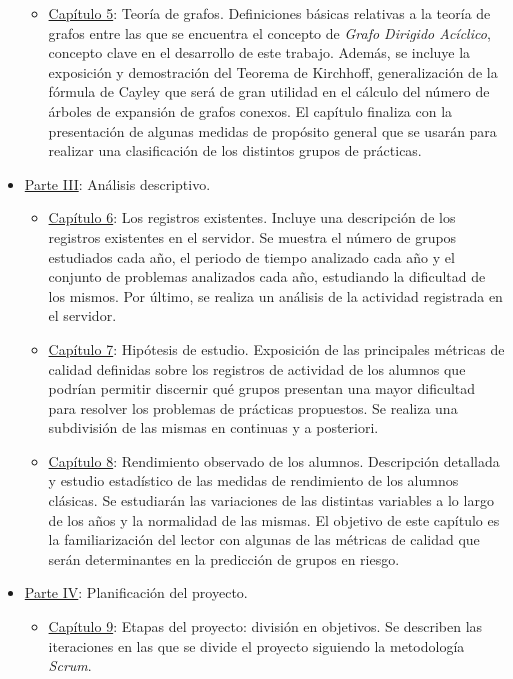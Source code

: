 \begin{itemize}
\begin{itemize}
\item \hyperref[sec:chapterV]{Capítulo 5}: Teoría de grafos. Definiciones básicas relativas a la teoría de grafos entre las que se encuentra el concepto de \emph{Grafo Dirigido Acíclico}, concepto clave en el desarrollo de este trabajo. Además, se incluye la exposición y demostración del Teorema de Kirchhoff, generalización de la fórmula de Cayley que será de gran utilidad en el cálculo del número de árboles de expansión de grafos conexos. El capítulo finaliza con la presentación de algunas medidas de propósito general que se usarán para realizar una clasificación de los distintos grupos de prácticas.
\end{itemize}
\item \hyperref[sec:parteIII]{Parte III}: Análisis descriptivo.
\begin{itemize}
\item \hyperref[sec:chapterVI]{Capítulo 6}: Los registros existentes.  Incluye una descripción de los registros existentes en el servidor. Se muestra el número de grupos estudiados cada año, el periodo de tiempo analizado cada año y el conjunto de problemas analizados cada año, estudiando la dificultad de los mismos. Por último, se realiza un análisis de la actividad registrada en el servidor.
\item \hyperref[sec:chapterVII]{Capítulo 7}: Hipótesis de estudio. Exposición de las principales métricas de calidad definidas sobre los registros de actividad de los alumnos que podrían permitir discernir qué grupos presentan una mayor dificultad para resolver los problemas de prácticas propuestos. Se realiza una subdivisión de las mismas en continuas y a posteriori.
\item \hyperref[chapter:rendimiento]{Capítulo 8}: Rendimiento observado de los alumnos. Descripción detallada y estudio estadístico de las medidas de rendimiento de los alumnos clásicas. Se estudiarán las variaciones de las distintas variables a lo largo de los años y la normalidad de las mismas. El objetivo de este capítulo es la familiarización del lector con algunas de las métricas de calidad que serán determinantes en la predicción de grupos en riesgo.
\end{itemize}
\item \hyperref[sec:parteIV]{Parte IV}: Planificación del proyecto.
\begin{itemize}
\item \hyperref[chapter:objetivos]{Capítulo 9}: Etapas del proyecto: división en objetivos. Se describen las iteraciones en las que se divide el proyecto siguiendo la metodología \emph{Scrum}.

\end{itemize}
\end{itemize}
